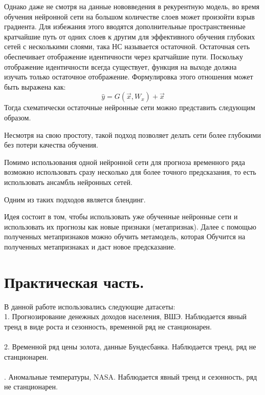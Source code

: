 \documentclass[12pt, a4paper]{article} %
\begin{document}
Однако даже не смотря на данные нововведения в рекурентную модель, во время обучения нейронной сети на большом количестве слоев может произойти взрыв градиента. Для избежания этого вводятся дополнительные пространственные кратчайшие путь от одних слоев к другим для эффективного обучения глубоких сетей с несколькими слоями, така НС называется остаточной\cite{Jaeyoung}.
Остаточная сеть обеспечивает отображение идентичности через кратчайшие пути. Поскольку отображение идентичности всегда существует, функция на выходе должна изучать только остаточное отображение. Формулировка этого отношения может быть выражена как:
\begin{equation}
    \hat{y} = G(\vec{x}, W_x) + \vec{x}
\end{equation}
Тогда схематически остаточные нейронные сети можно представить следующим образом.

Несмотря на свою простоту, такой подход позволяет делать сети более глубокими без потери качества обучения\cite{Jaeyoung}.

Помимо использования одной нейронной сети для прогноза временного ряда возможно использовать сразу несколько для более точного предсказания, то есть использовать ансамбль нейронных сетей.

Одним из таких подходов является блендинг.

Идея состоит в том, чтобы использовать уже обученные нейронные сети и использовать их прогнозы как новые признаки (метапризнак). Далее с помощью полученных метапризнаков можно обучить метамодель, которая Обучится на полученных метапризнаках и даст новое предсказание.

\newpage
\section{Практическая часть.}
В данной работе использовались следующие датасеты:\\
1. Прогнозирование денежных доходов населения, ВШЭ. Наблюдается явный тренд в виде роста и сезонность, временной ряд не станционарен.\\
\\
2. Временной ряд цены золота, данные Бундесбанка. Наблюдается тренд, ряд не станционарен.\\
\\
. Аномальные температуры, NASA. Наблюдается явный тренд и сезонность, ряд не станционарен.
\end{document}
